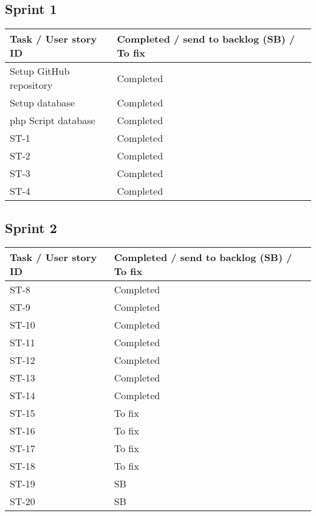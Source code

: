 \documentclass[12pt]{article}
\begin{document}
\subsection{Sprint 1}
{
\centering
\begin{longtable}{| p{7cm} | p{7cm}|}
			\hline			
			\textbf{Task / User story ID} & \textbf{Completed / send to backlog (SB) / To fix }
			\\ \hline  Setup GitHub repository & Completed \\ \hline
             \hline  Setup database & Completed \\ \hline
             \hline  php Script database & Completed \\ \hline
			 \hline  ST-1 & Completed \\ \hline
             \hline  ST-2 & Completed \\ \hline
             \hline  ST-3 & Completed \\ \hline
             \hline  ST-4 & Completed \\ \hline
            
\end{longtable}
}

\subsection{Sprint 2}
{
\centering
\begin{longtable}{| p{7cm} | p{7cm}|}
			\hline			
			\textbf{Task / User story ID} & \textbf{Completed / send to backlog (SB) / To fix }
			 \\ \hline  ST-8 & Completed \\ \hline
             \hline  ST-9 & Completed \\ \hline
             \hline  ST-10 & Completed \\ \hline
             \hline  ST-11 & Completed \\ \hline
             \hline  ST-12 & Completed \\ \hline
             \hline  ST-13 & Completed \\ \hline
             \hline  ST-14 & Completed \\ \hline
             \hline  ST-15 & To fix \\ \hline
             \hline  ST-16 & To fix \\ \hline 
             \hline  ST-17 & To fix \\ \hline
             \hline  ST-18 & To fix \\ \hline
             \hline  ST-19 & SB \\ \hline
             \hline  ST-20 & SB \\ \hline
\end{longtable}
}
\end{document}
